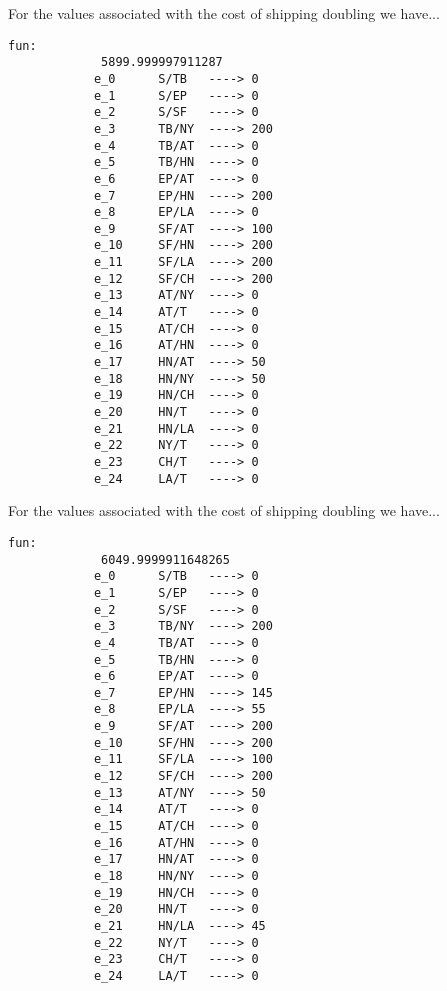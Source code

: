 \documentclass[11pt]{article}
\begin{document}
    \begin{minipage}[t]{0.42\linewidth}
        For the values associated with the cost of shipping doubling we have...

        \begin{lstlisting}[basicstyle=\small, gobble=12]
            fun:
             5899.999997911287
            e_0  	 S/TB 	----> 0
            e_1  	 S/EP 	----> 0
            e_2  	 S/SF 	----> 0
            e_3  	 TB/NY 	----> 200
            e_4  	 TB/AT 	----> 0
            e_5  	 TB/HN 	----> 0
            e_6  	 EP/AT 	----> 0
            e_7  	 EP/HN 	----> 200
            e_8  	 EP/LA 	----> 0
            e_9  	 SF/AT 	----> 100
            e_10  	 SF/HN 	----> 200
            e_11  	 SF/LA 	----> 200
            e_12  	 SF/CH 	----> 200
            e_13  	 AT/NY 	----> 0
            e_14  	 AT/T 	----> 0
            e_15  	 AT/CH 	----> 0
            e_16  	 AT/HN 	----> 0
            e_17  	 HN/AT 	----> 50
            e_18  	 HN/NY 	----> 50
            e_19  	 HN/CH 	----> 0
            e_20  	 HN/T 	----> 0
            e_21  	 HN/LA 	----> 0
            e_22  	 NY/T 	----> 0
            e_23  	 CH/T 	----> 0
            e_24  	 LA/T 	----> 0      
        \end{lstlisting}
    \end{minipage} \hfill \vline \hfill%
    \begin{minipage}[t]{0.42\linewidth}
        For the values associated with the cost of shipping doubling we have...

        \begin{lstlisting}[basicstyle=\small, gobble=12]
            fun:
             6049.9999911648265
            e_0  	 S/TB 	----> 0
            e_1  	 S/EP 	----> 0
            e_2  	 S/SF 	----> 0
            e_3  	 TB/NY 	----> 200
            e_4  	 TB/AT 	----> 0
            e_5  	 TB/HN 	----> 0
            e_6  	 EP/AT 	----> 0
            e_7  	 EP/HN 	----> 145
            e_8  	 EP/LA 	----> 55
            e_9  	 SF/AT 	----> 200
            e_10  	 SF/HN 	----> 200
            e_11  	 SF/LA 	----> 100
            e_12  	 SF/CH 	----> 200
            e_13  	 AT/NY 	----> 50
            e_14  	 AT/T 	----> 0
            e_15  	 AT/CH 	----> 0
            e_16  	 AT/HN 	----> 0
            e_17  	 HN/AT 	----> 0
            e_18  	 HN/NY 	----> 0
            e_19  	 HN/CH 	----> 0
            e_20  	 HN/T 	----> 0
            e_21  	 HN/LA 	----> 45
            e_22  	 NY/T 	----> 0
            e_23  	 CH/T 	----> 0
            e_24  	 LA/T 	----> 0
        \end{lstlisting}
    \end{minipage}
\end{document}

